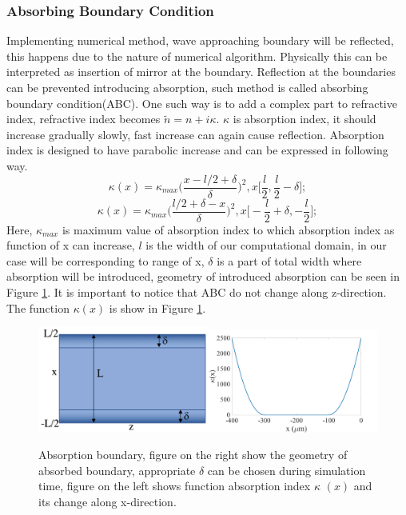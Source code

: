 \documentclass[a4paper]{article}
\begin{document}
	\subsubsection{Absorbing Boundary Condition}
	Implementing numerical method, wave approaching boundary will be reflected, this happens due to the nature of numerical algorithm. Physically this can be interpreted as insertion of mirror at the boundary. Reflection at the boundaries can be prevented introducing absorption, such method is called absorbing boundary condition(ABC). One such way is to add a complex part to refractive index, refractive index becomes $\tilde{n} = n+i\kappa$. $\kappa$  is absorption index, it should increase gradually slowly, fast increase can again cause reflection. Absorption index is designed to have parabolic increase and can be expressed in following way.
	\[\kappa(x)=\kappa_{max}\bigg(\frac{x-l/2+\delta}{\delta}\bigg)^2, x\bigg[\frac{l}{2},\frac{l}{2}-\delta\bigg];\]
	\[\kappa(x)=\kappa_{max}\bigg(\frac{l/2+\delta-x}{\delta}\bigg)^2, x\bigg[-\frac{l}{2}+\delta,-\frac{l}{2}\bigg];\]
	Here, $\kappa_{max}$ is maximum value of absorption index to which absorption index as function of x can increase, $l$ is the width of our computational domain, in our case will be corresponding to range of x, $\delta$ is a part of total width where absorption will be introduced, geometry of introduced absorption can be seen in Figure \ref{fig:Absorption}. It is important to notice that ABC do not change along z-direction. The function $\kappa (x)$ is show in Figure \ref{fig:Absorption}.
	\begin{figure}[h!]
		\centering 
		\includegraphics[width=0.5\textwidth]{sketchN1.png}\includegraphics[width=0.5\textwidth]{N2.jpg}
		\caption{\label{fig:Absorption}Absorption boundary, figure on the right show the geometry of absorbed boundary, appropriate $\delta$ can be chosen during simulation time, figure on the left shows function absorption index $\kappa$ $ (x) $ and its change along x-direction.}
	\end{figure}
\end{document}

